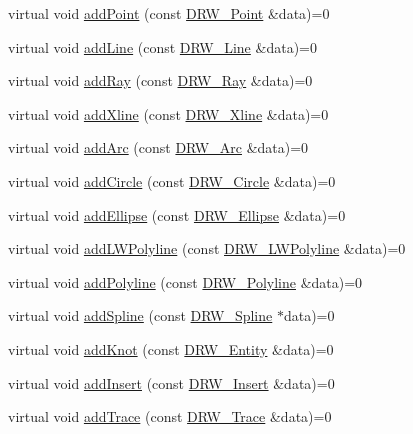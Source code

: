 \begin{DoxyCompactItemize}
virtual void \hyperlink{class_d_r_w___interface_af1b9e163c87a3f84a5c06dbc2a6bd18b}{add\+Point} (const \hyperlink{class_d_r_w___point}{D\+R\+W\+\_\+\+Point} \&data)=0
\item 
virtual void \hyperlink{class_d_r_w___interface_a6422d075d59ed28408394bc5d68033e1}{add\+Line} (const \hyperlink{class_d_r_w___line}{D\+R\+W\+\_\+\+Line} \&data)=0
\item 
virtual void \hyperlink{class_d_r_w___interface_a4718019d01569f13a50a29fcb9ba583f}{add\+Ray} (const \hyperlink{class_d_r_w___ray}{D\+R\+W\+\_\+\+Ray} \&data)=0
\item 
virtual void \hyperlink{class_d_r_w___interface_a5cb4ece224c8006de498eb60e354ee9a}{add\+Xline} (const \hyperlink{class_d_r_w___xline}{D\+R\+W\+\_\+\+Xline} \&data)=0
\item 
virtual void \hyperlink{class_d_r_w___interface_a7abe9b6b69b8239fbad804eb68b0463e}{add\+Arc} (const \hyperlink{class_d_r_w___arc}{D\+R\+W\+\_\+\+Arc} \&data)=0
\item 
virtual void \hyperlink{class_d_r_w___interface_a921046eb1a06ad4753b9aaae9518af73}{add\+Circle} (const \hyperlink{class_d_r_w___circle}{D\+R\+W\+\_\+\+Circle} \&data)=0
\item 
virtual void \hyperlink{class_d_r_w___interface_a8a4d9d0ded98a7fa9ba5dd6d0005a491}{add\+Ellipse} (const \hyperlink{class_d_r_w___ellipse}{D\+R\+W\+\_\+\+Ellipse} \&data)=0
\item 
virtual void \hyperlink{class_d_r_w___interface_a14ec6d00f6f34857b91543497d9d4e09}{add\+L\+W\+Polyline} (const \hyperlink{class_d_r_w___l_w_polyline}{D\+R\+W\+\_\+\+L\+W\+Polyline} \&data)=0
\item 
virtual void \hyperlink{class_d_r_w___interface_a9e2c6ab12b71e73ab443765a5a42d171}{add\+Polyline} (const \hyperlink{class_d_r_w___polyline}{D\+R\+W\+\_\+\+Polyline} \&data)=0
\item 
virtual void \hyperlink{class_d_r_w___interface_a72d1cd0692fb061ea34ea246c54156ad}{add\+Spline} (const \hyperlink{class_d_r_w___spline}{D\+R\+W\+\_\+\+Spline} $\ast$data)=0
\item 
virtual void \hyperlink{class_d_r_w___interface_a6e19d01637ff9336bcd513511ba1177c}{add\+Knot} (const \hyperlink{class_d_r_w___entity}{D\+R\+W\+\_\+\+Entity} \&data)=0
\item 
virtual void \hyperlink{class_d_r_w___interface_a2aae96a5a0f5305d2e1f3254c871d2fc}{add\+Insert} (const \hyperlink{class_d_r_w___insert}{D\+R\+W\+\_\+\+Insert} \&data)=0
\item 
virtual void \hyperlink{class_d_r_w___interface_a3e09cf10863708e1ca74b2f723dc98a2}{add\+Trace} (const \hyperlink{class_d_r_w___trace}{D\+R\+W\+\_\+\+Trace} \&data)=0

\end{DoxyCompactItemize}
